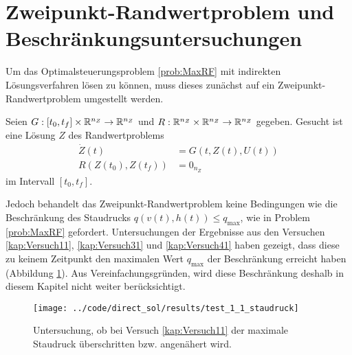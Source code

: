 












\section{Zweipunkt-Randwertproblem und Beschränkungsuntersuchungen}
Um das Optimalsteuerungsproblem \ref{prob:MaxRF} mit indirekten Lösungsverfahren lösen zu können, muss dieses zunächst auf ein Zweipunkt-Randwertproblem umgestellt werden.

\begin{problem}\label{prob:ZweiRand}
Seien $G : [t_0,t_f] \times \mathbb{R}^{n_Z} \to \mathbb{R}^{n_Z}$ und $R : \mathbb{R}^{n_Z} \times \mathbb{R}^{n_Z} \to \mathbb{R}^{n_Z}$ gegeben. Gesucht ist eine Lösung $Z$ des Randwertproblems
\begin{align}
\dot{Z}(t) &= G(t,Z(t),U(t)) \\
R(Z(t_0),Z(t_f)) &= 0_{n_Z}
\end{align}
im Intervall $[t_0,t_f]$.
\end{problem}

Jedoch behandelt das Zweipunkt-Randwertproblem keine Bedingungen wie die Beschränkung des Staudrucks $q(v(t),h(t)) \leq q_{\max}$, wie in Problem \ref{prob:MaxRF} gefordert. Untersuchungen der Ergebnisse aus den Versuchen \ref{kap:Versuch11}, \ref{kap:Versuch31} und  \ref{kap:Versuch41} haben gezeigt, dass diese zu keinem Zeitpunkt den maximalen Wert $q_{\max}$ der Beschränkung erreicht haben (Abbildung \ref{img:test_1_1_staudruck}). Aus Vereinfachungsgründen, wird diese Beschränkung deshalb in diesem Kapitel nicht weiter berücksichtigt.

\begin{figure}[H]
\begin{center}
\texttt{[image: ../code/direct\_sol/results/test\_1\_1\_staudruck]}
\caption{Untersuchung, ob bei Versuch \ref{kap:Versuch11} der maximale Staudruck überschritten bzw. angenähert wird.}\label{img:test_1_1_staudruck}
\end{center}
\end{figure}

















